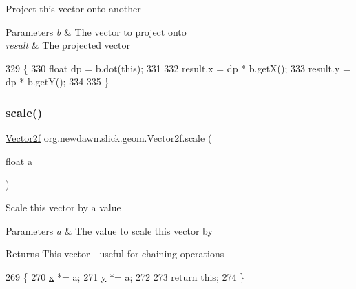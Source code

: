 Project this vector onto another


\begin{DoxyParams}{Parameters}
{\em b} & The vector to project onto \\
\hline
{\em result} & The projected vector \\
\hline
\end{DoxyParams}

\begin{DoxyCode}
329                                                              \{
330         \textcolor{keywordtype}{float} dp = b.dot(\textcolor{keyword}{this});
331         
332         result.x = dp * b.getX();
333         result.y = dp * b.getY();
334         
335     \}
\end{DoxyCode}
\mbox{\label{classorg_1_1newdawn_1_1slick_1_1geom_1_1_vector2f_afce66facdf9a71f94a0155901b743b6d}} 
\subsubsection{\texorpdfstring{scale()}{scale()}}
{\footnotesize\ttfamily \mbox{\hyperlink{classorg_1_1newdawn_1_1slick_1_1geom_1_1_vector2f}{Vector2f}} org.\+newdawn.\+slick.\+geom.\+Vector2f.\+scale (\begin{DoxyParamCaption}\item[{float}]{a }\end{DoxyParamCaption})\hspace{0.3cm}{\ttfamily [inline]}}

Scale this vector by a value


\begin{DoxyParams}{Parameters}
{\em a} & The value to scale this vector by \\
\hline
\end{DoxyParams}
\begin{DoxyReturn}{Returns}
This vector -\/ useful for chaining operations 
\end{DoxyReturn}

\begin{DoxyCode}
269     \{
270         \mbox{\hyperlink{classorg_1_1newdawn_1_1slick_1_1geom_1_1_vector2f_a3c72cdf13ebc511a472e1a02002fa579}{x}} *= a; 
271         \mbox{\hyperlink{classorg_1_1newdawn_1_1slick_1_1geom_1_1_vector2f_aa03914f0c3d32063aa90e5bd7b74688e}{y}} *= a;
272         
273         \textcolor{keywordflow}{return} \textcolor{keyword}{this};
274     \}
\end{DoxyCode}
\mbox{\label{classorg_1_1newdawn_1_1slick_1_1geom_1_1_vector2f_aa966a6b1e57f122639b3422c2c5578ec}} 
